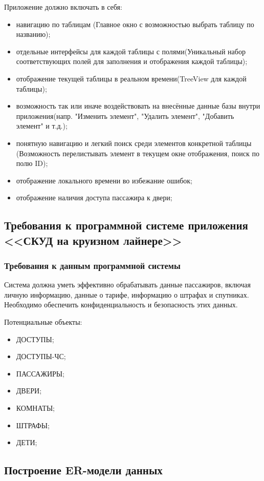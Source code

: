 Приложение должно включать в себя:
\begin{itemize}
	\item навигацию по таблицам (Главное окно с возможностью выбрать таблицу по названию);
	\item отдельные интерфейсы для каждой таблицы с полями(Уникальный набор соответствующих полей для заполнения и отображения каждой таблицы);
	\item отображение текущей таблицы в реальном времени(TreeView для каждой таблицы);
	\item возможность так или иначе воздействовать на внесённые данные базы внутри приложения(напр. "Изменить элемент", "Удалить элемент", "Добавить элемент" и т.д.);
	\item понятную навигацию и легкий поиск среди элементов конкретной таблицы (Возможность перелистывать элемент в текущем окне отображения, поиск по полю ID);
	\item отображение локального времени во избежание ошибок;
	\item отображение наличия доступа пассажира к двери;
\end{itemize}

\subsection{Требования к программной системе приложения <<СКУД на круизном лайнере>>}
\subsubsection{Требования к данным программной системы}

Система должна уметь эффективно обрабатывать данные пассажиров, включая личную информацию, данные о тарифе, информацию о штрафах и спутниках. Необходимо обеспечить конфиденциальность и безопасность этих данных.

Потенциальные объекты:
\begin{itemize}
	\item ДОСТУПЫ;
	\item ДОСТУПЫ-ЧС;
	\item ПАССАЖИРЫ;
	\item ДВЕРИ;
	\item КОМНАТЫ;
	\item ШТРАФЫ;
	\item ДЕТИ;
\end{itemize}


\subsection{Построение ER-модели данных}

